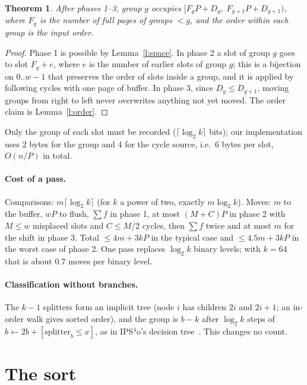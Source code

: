 \documentclass[11pt]{article}
\newtheorem{theorem}{Theorem}
\theoremstyle{remark}
\renewcommand{\lg}{\log_2}
\begin{document}
\begin{theorem}
After phases 1--3, group $g$ occupies $[F_gP+D_g,\;F_{g+1}P+D_{g+1})$, where
$F_g$ is the number of full pages of groups $<g$, and the order within each
group is the input order.
\end{theorem}
\begin{proof}
Phase 1 is possible by Lemma~\ref{l:space}. In phase 2 a slot of group $g$ goes
to slot $F_g+e$, where $e$ is the number of earlier slots of group $g$; this is a bijection on
$0..w-1$ that preserves the order of slots inside a group, and it is applied by
following cycles with one page of buffer. In phase 3, since $D_g\le D_{g+1}$,
moving groups from right to left never overwrites anything not yet moved. The
order claim is Lemma~\ref{l:order}.
\end{proof}

Only the group of each slot must be recorded ($\lceil\lg k\rceil$ bits); our
implementation uses 2 bytes for the group and 4 for the cycle source, i.e.\ 6 bytes
per slot, $O(n/P)$ in total.

\paragraph{Cost of a pass.}
Comparisons: $m\lceil\lg k\rceil$ (for $k$ a power of two, exactly $m\lg k$).
Moves: $m$ to the buffer, $wP$ to flush, $\sum f$ in phase 1, at most $(M+C)P$ in
phase 2 with $M\le w$ misplaced slots and $C\le M/2$ cycles, then $\sum f$ twice and
at most $m$ for the shift in phase 3. Total $\le4m+3kP$ in the typical case and
$\le4.5m+3kP$ in the worst case of phase 2. One pass replaces $\lg k$ binary
levels; with $k=64$ that is about $0.7$ moves per binary level.

\paragraph{Classification without branches.}
The $k-1$ splitters form an implicit tree (node $i$ has children $2i$ and $2i+1$;
an in-order walk gives sorted order), and the group is $b-k$ after $\lg k$ steps of
$b\gets2b+[\text{splitter}_b\le x]$, as in IPS$^4$o's decision tree~\cite{ips4o}.
This changes no count.

\section{The sort}
\end{document}
